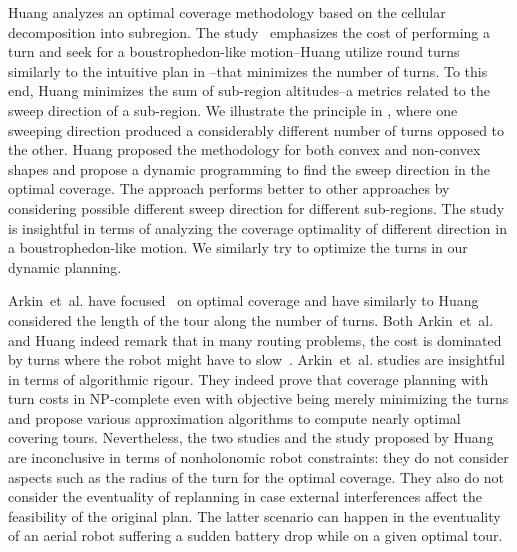 Huang analyzes an optimal coverage methodology based on the cellular decomposition into subregion. The study~\citep{huang2001optimal} emphasizes the cost of performing a turn and seek for a boustrophedon-like motion--Huang utilize round turns similarly to the intuitive plan in --that minimizes the number of turns. To this end, Huang minimizes the sum of sub-region altitudes--a metrics related to the sweep direction of a sub-region. We illustrate the principle in , where one sweeping direction produced a considerably different number of turns opposed to the other. Huang proposed the methodology for both convex and non-convex shapes and propose a dynamic programming to find the sweep direction in the optimal coverage. The approach performs better to other approaches by considering possible different sweep direction for different sub-regions. The study is insightful in terms of analyzing the coverage optimality of different direction in a boustrophedon-like motion. We similarly try to optimize the turns in our dynamic planning. 


Arkin~et~al. have focused~\citep{arkin2001optimal,arkin2005optimal} on optimal coverage and have similarly to Huang considered the length of the tour along the number of turns. Both Arkin~et~al. and Huang indeed remark that in many routing problems, the cost is dominated by turns where the robot might have to slow~\citep{arkin2001optimal}.  Arkin~et~al. studies are insightful in terms of algorithmic rigour. They indeed prove that coverage planning with turn costs in NP-complete even with objective being merely minimizing the turns and propose various approximation algorithms to compute nearly optimal covering tours. Nevertheless, the two studies and the study proposed by Huang are inconclusive in terms of nonholonomic robot constraints: they do not consider aspects such as the radius of the turn for the optimal coverage. They also do not consider the eventuality of replanning in case external interferences affect the feasibility of the original plan. The latter scenario can happen in the eventuality of an aerial robot suffering a sudden battery drop while on a given optimal tour. 


